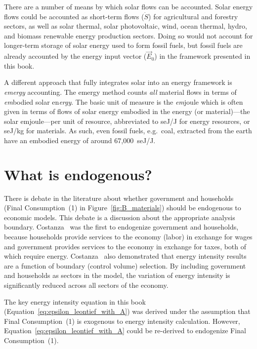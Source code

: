 There are a number of means by which solar flows can be accounted. 
Solar energy flows could be accounted as short-term flows ($\dot{S}$)
for agricultural and forestry sectors, 
as well as 
solar thermal, 
solar photovoltaic, 
wind, 
ocean thermal, 
hydro, and
biomass
renewable energy
production sectors.
Doing so would not account for longer-term storage
of solar energy used to form fossil fuels, 
but fossil fuels are already accounted by the energy input vector ($\vec{E}_{0}$)
in the framework presented in this book.

A different approach that fully integrates solar 
into an energy framework is \emph{emergy} accounting.
The emergy method counts \emph{all} material flows 
in terms of \emph{em}bodied solar en\emph{ergy}.\cite{Odum1975, Odum1996}
The basic unit of measure is 
the \emph{em}joule which is often given in terms 
of flows of solar energy embodied in 
the energy (or material)---the solar emjoule---per unit of resource, 
abbreviated to seJ/J for energy resources, 
or seJ/kg for materials. 
As such, even fossil fuels, e.g.\ coal, 
extracted from the earth have an embodied energy 
of around 67,000~seJ/J.\cite{Brown2004} 


\section{What is endogenous?}
\label{sec:what_is_endogenous}

There is debate in the literature about whether government
and households
(Final Consumption~(1) in Figure~\ref{fig:B_materials}) 
should be endogenous to economic models.
This debate is a discussion about the appropriate analysis boundary.
Costanza~\cite{Costanza:1980ww} was the first to endogenize government and households, 
because households provide services to the economy (labor) in exchange for wages 
and government provides services to the economy in exchange for taxes, 
both of which require energy. 
Costanza~\cite{Costanza:1980ww} also demonstrated that 
energy intensity results
are a function of boundary (control volume) selection. 
By including government and households 
as sectors in the model, 
the variation of energy intensity is significantly reduced 
across all sectors of the economy. 

The key energy intensity equation in this book
(Equation~\ref{eq:epsilon_leontief_with_A})
was derived under the assumption that Final Consumption~(1)
is exogenous to energy intensity calculation.
However, Equation~\ref{eq:epsilon_leontief_with_A}
could be re-derived to endogenize 
Final Consumption~(1).

